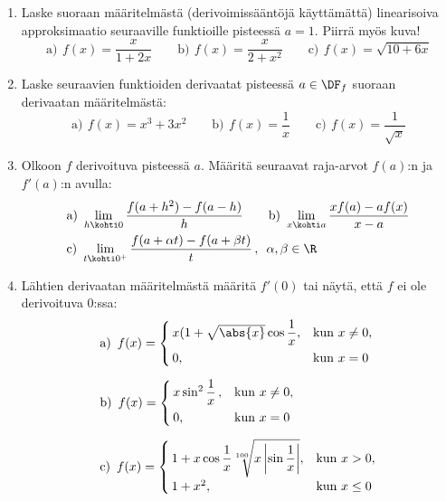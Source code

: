 \Harj
\begin{enumerate}

\item
Laske suoraan määritelmästä (derivoimissääntöjä käyttämättä) linearisoiva approksimaatio
seuraaville funktioille pisteessä $a=1$. Piirrä myös kuva! 
\[
\text{a)}\,\ f(x)=\frac{x}{1+2x} \qquad 
\text{b)}\,\ f(x)=\frac{x}{2+x^2} \qquad
\text{c)}\,\ f(x)=\sqrt{10+6x}
\]

\item
Laske seuraavien funktioiden derivaatat pisteessä $a\in\DF_f$ suoraan derivaatan
määritelmästä:
\[
\text{a)}\,\ f(x)=x^3+3x^2 \qquad 
\text{b)}\,\ f(x)=\frac{1}{x} \qquad
\text{c)}\,\ f(x)=\frac{1}{\sqrt{x}}
\]

\item
Olkoon $f$ derivoituva pisteessä $a$. Määritä seuraavat raja-arvot $f(a)$:n ja $f'(a)$:n
avulla:
\begin{align*}
&\text{a)}\ \lim_{h \kohti 0} \frac{f(a+h^2)-f(a-h)}{h} \qquad
 \text{b)}\ \lim_{x \kohti a} \frac{xf(a)-af(x)}{x-a} \\
&\text{c)}\ \lim_{t \kohti 0^+} \frac{f(a+\alpha t)-f(a+\beta t)}{t}\,,\,\ \alpha,\beta\in\R
\end{align*}

\item \label{H-V-4: trig-esim}
Lähtien derivaatan määritelmästä määritä $f'(0)$ tai näytä, että $f$ ei ole derivoituva
$0$:ssa:
\begin{align*}
&\text{a)}\,\ f(x)=\begin{cases}
                   \,x(1+\sqrt{\abs{x}}\cos\dfrac{1}{x}, &\text{kun}\ x \neq 0, \\[2mm] 
                   \,0,                                  &\text{kun}\ x=0
                   \end{cases} \\[2mm]
&\text{b)}\,\ f(x)=\begin{cases}
                   \,x\sin^2\dfrac{1}{x}\,, &\text{kun}\ x \neq 0, \\[2mm] 
                   \,0,                     &\text{kun}\ x=0
                   \end{cases} \\[2mm]
&\text{c)}\,\ f(x)=\begin{cases}
                   \,1+x\cos\dfrac{1}{x}\sqrt[100]{x\left|\sin\dfrac{1}{x}\right|},
                                            &\text{kun}\ x>0, \\[2mm]
                   \,1+x^2,                 &\text{kun}\ x \le 0
                   \end{cases}
\end{align*}


\end{enumerate}
